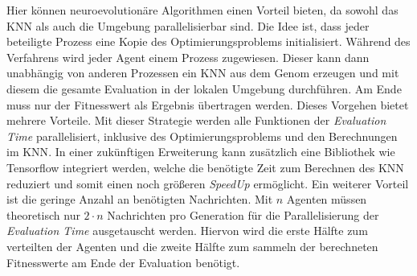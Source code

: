Hier können neuroevolutionäre Algorithmen einen Vorteil bieten, da sowohl das \ac{KNN} als auch die Umgebung parallelisierbar sind. Die Idee ist, dass jeder beteiligte Prozess eine Kopie des Optimierungsproblems initialisiert. Während des Verfahrens wird jeder Agent einem Prozess zugewiesen. Dieser kann dann unabhängig von anderen Prozessen ein \ac{KNN} aus dem Genom erzeugen und mit diesem die gesamte Evaluation in der lokalen Umgebung durchführen. Am Ende muss nur der Fitnesswert als Ergebnis übertragen werden. Dieses Vorgehen bietet mehrere Vorteile. Mit dieser Strategie werden alle Funktionen der \emph{Evaluation Time} parallelisiert, inklusive des Optimierungsproblems und den Berechnungen im \ac{KNN}. In einer zukünftigen Erweiterung kann zusätzlich eine Bibliothek wie Tensorflow integriert werden, welche die benötigte Zeit zum Berechnen des \ac{KNN} reduziert und somit einen noch größeren \emph{SpeedUp} ermöglicht. Ein weiterer Vorteil ist die geringe Anzahl an benötigten Nachrichten. Mit $n$ Agenten müssen theoretisch nur $2 \cdot n$ Nachrichten pro Generation für die Parallelisierung der \emph{Evaluation Time} ausgetauscht werden. Hiervon  wird die erste Hälfte zum verteilten der Agenten und die zweite Hälfte zum sammeln der berechneten Fitnesswerte am Ende der Evaluation benötigt. 

 



